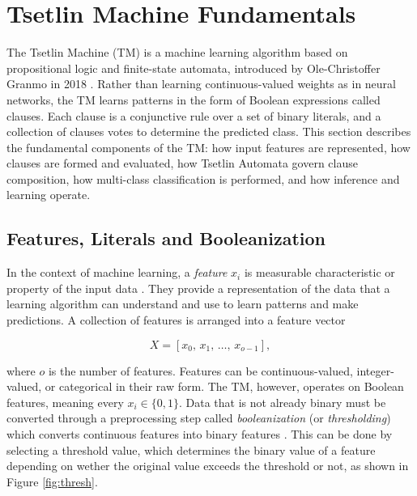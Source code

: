 \section{Tsetlin Machine Fundamentals}
\label{sec:tm_fundamentals}

The Tsetlin Machine (TM) is a machine learning algorithm based on propositional logic and finite-state automata, introduced by Ole-Christoffer Granmo in 2018 \cite{GranmoOle-Christoffer2018TTM-}. Rather than learning continuous-valued weights as in neural networks, the TM learns patterns in the form of Boolean expressions called clauses. Each clause is a conjunctive rule over a set of binary literals, and a collection of clauses votes to determine the predicted class. This section describes the fundamental components of the TM: how input features are represented, how clauses are formed and evaluated, how Tsetlin Automata govern clause composition, how multi-class classification is performed, and how inference and learning operate. 

\subsection{Features, Literals and Booleanization}
\label{sec:tm_features_literals}

In the context of machine learning, a \textit{feature} $x_i$ is measurable characteristic or property of the input data \cite{GranmoOle-Christoffer2018TTM-}. They provide a representation of the data that a learning algorithm can understand and use to learn patterns and make predictions. A collection of features is arranged into a feature vector 

\begin{equation}
    X = [x_0,\, x_1,\, \ldots,\, x_{o-1}],
    \label{eq:feature_vector}
\end{equation}

where $o$ is the number of features. Features can be continuous-valued, integer-valued, or categorical in their raw form. The TM, however, operates on Boolean features, meaning every $x_i \in \{0, 1\}$. Data that is not already binary must be converted through a preprocessing step called \textit{booleanization} (or \textit{thresholding}) which converts continuous features into binary features \cite{GranmoOle-Christoffer2018TTM-}. This can be done by selecting a threshold value, which determines the binary value of a feature depending on wether the original value exceeds the threshold or not, as shown in Figure \ref{fig:thresh}.

